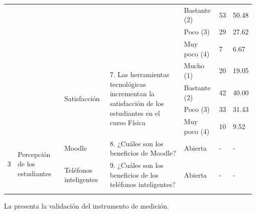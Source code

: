 \documentclass[spanish]{textolivre}
\begin{document}
\begin{table}[htpb]
\begin{threeparttable}
\begin{tabular}{*{3}{l}p{3.5cm}*{3}{l}}
 & & & & Bastante (2) & 53 & 50.48 \\
 & & & & Poco (3) & 29 & 27.62 \\
 & & & & Muy poco (4) & 7 & 6.67 \\
 \cmidrule{3-7}
 & & \multicolumn{1}{p{3cm}}{\multirow{4}{=}{Satisfacción}} & \multirow{4}{=}{7. Las herramientas tecnológicas incrementan la satisfacción de los estudiantes en el curso Física} & Mucho (1) & 20 & 19.05 \\
 & & & & Bastante (2) & 42 & 40.00 \\
 & & & & Poco (3) & 33 & 31.43 \\
 & & & & Muy poco (4) & 10 & 9.52 \\
\midrule
\multirow{2}{*}{3} & \multicolumn{1}{p{1.5cm}}{\multirow{2}{=}{Percepción de los estudiantes}} & Moodle & 8. ¿Cuáles son los beneficios de Moodle? & Abierta & - & - \\
 & & Teléfonos inteligentes & 9. ¿Cuáles son los beneficios de los teléfonos inteligentes? & Abierta & - & - \\
\arrayrulecolor{black}
\bottomrule
\end{tabular}
\end{threeparttable}
\end{table}



La  presenta la validación del instrumento de medición.

\end{document}
